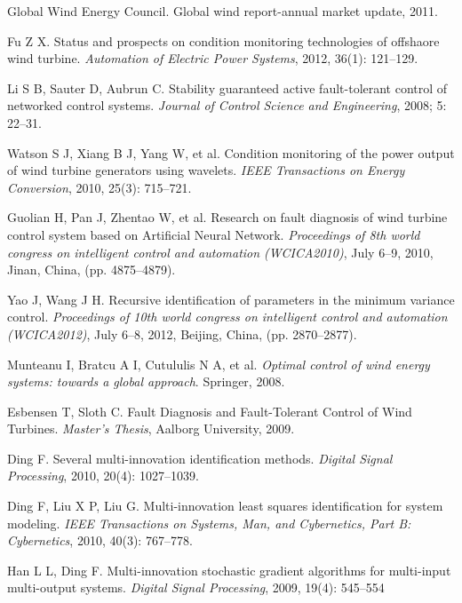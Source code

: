 \documentclass{article}
\begin{document}

\clearpage
\begin{thebibliography}{99}
Global Wind Energy Council. Global wind report-annual market update, 2011.

Fu Z X. Status and prospects on condition monitoring technologies of offshaore wind turbine. \emph{Automation of Electric Power Systems}, 2012, 36(1): 121--129.


Li S B, Sauter D, Aubrun C. Stability guaranteed active fault-tolerant control of networked control systems. \emph{Journal of Control Science and Engineering}, 2008; 5: 22--31.

Watson S J, Xiang B J, Yang W, et al. Condition monitoring of the power output of wind turbine generators using wavelets. \emph{IEEE Transactions on Energy Conversion}, 2010, 25(3): 715--721.

Guolian H, Pan J, Zhentao W, et al. Research on fault diagnosis of wind turbine control system based on Artificial Neural Network. \emph{Proceedings of 8th world congress on intelligent control and automation (WCICA2010)}, July 6--9, 2010, Jinan, China, (pp. 4875--4879).

Yao J, Wang J H. Recursive identification of parameters in the minimum variance control. \emph{Proceedings of 10th world congress on intelligent control and automation (WCICA2012)}, July 6--8, 2012, Beijing, China, (pp. 2870--2877).

Munteanu I, Bratcu A I, Cutululis N A, et al. \emph{Optimal control of wind energy systems: towards a global approach}. Springer, 2008.


Esbensen T, Sloth C. Fault Diagnosis and Fault-Tolerant Control of Wind Turbines. \emph{Master's Thesis}, Aalborg University, 2009.

Ding F. Several multi-innovation identification methods. \emph{Digital Signal Processing}, 2010, 20(4): 1027--1039.

Ding F, Liu X P, Liu G. Multi-innovation least squares identification for system modeling. \emph{IEEE Transactions on Systems, Man, and Cybernetics, Part B: Cybernetics}, 2010, 40(3): 767--778.

Han L L, Ding F. Multi-innovation stochastic gradient algorithms for multi-input multi-output systems. \emph{Digital Signal Processing}, 2009, 19(4): 545--554


\end{thebibliography}
\end{document}
